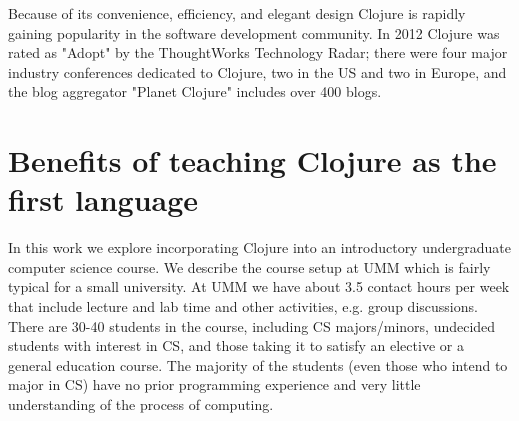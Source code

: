 \documentclass[submission,copyright,creativecommons]{eptcs}
\newcommand{\allcomments}[1]{{#1}}
\newcommand{\elenacomment}[1]{{\bf \textcolor{ForestGreen}{\allcomments{{#1}}}}}
\newcommand{\stephencomment}[1]{{\bf \color{StephensBlue}{\allcomments{{#1}}}}} %
\newcommand{\joecomment}[1]{{\bf \color{JoesGold}{\allcomments{{#1}}}}}
\begin{document}
Because of its convenience, efficiency, and elegant design 
Clojure is rapidly gaining popularity in the software development community. In 2012 Clojure was rated as "Adopt" by the ThoughtWorks Technology Radar; there were four major industry conferences dedicated to Clojure, two in the US and two in Europe, and the blog aggregator "Planet Clojure" includes over 400 blogs.%

\section{Benefits of teaching Clojure as the first language}\label{sec:benefits}
In this work we explore incorporating Clojure into an introductory undergraduate computer science course. We describe the course setup at UMM which is fairly typical for a small university. At UMM we have about 3.5 contact hours per week that include lecture and lab time and other activities, e.g. group discussions. There are 30-40 students in the course, including CS majors/minors, undecided students with  interest in CS, and those taking it to satisfy an elective or a general education course. The majority of the students (even those who intend to major in CS)  have no prior programming experience and very little understanding of the process of computing. 
\end{document}
